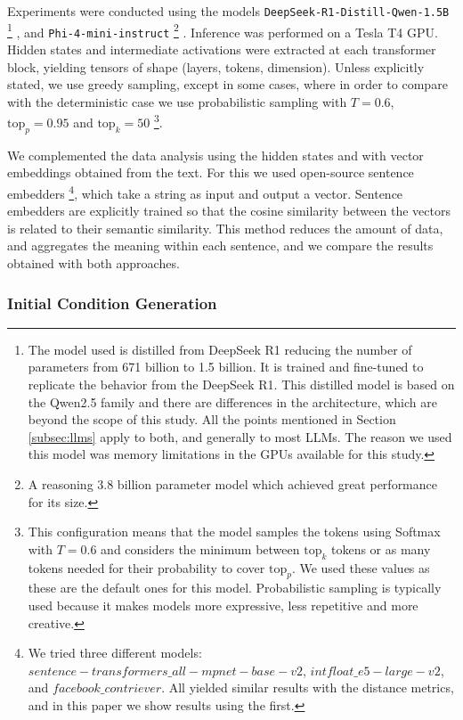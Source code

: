 \documentclass[a4paper,12pt]{article}
\begin{document}
    Experiments were conducted using the models \texttt{DeepSeek-R1-Distill-Qwen-1.5B} \footnote{The model used is distilled from DeepSeek R1 reducing the number of parameters from 671 billion to 1.5 billion. It is trained and fine-tuned to replicate the behavior from the DeepSeek R1. This distilled model is based on the Qwen2.5 family and there are differences in the architecture, which are beyond the scope of this study. All the points mentioned in Section \ref{subsec:llms} apply to both, and generally to most LLMs. The reason we used this model was memory limitations in the GPUs available for this study.} \cite{deepseek2025r1distillqwen1.5b}, and \texttt{Phi-4-mini-instruct} \footnote{A reasoning 3.8 billion parameter model which achieved great performance for its size.} \cite{microsoft2025phi4minitechnicalreportcompact, microsoft/Phi-4-mini-instruct}. 
    Inference was performed on a Tesla T4 GPU. Hidden states and intermediate activations were extracted at each transformer block, yielding tensors of shape (layers, tokens, dimension). 
    Unless explicitly stated, we use greedy sampling, except in some cases, where in order to compare with the deterministic case we use probabilistic sampling with $T=0.6$, $\text{top}_p = 0.95$ and $\text{top}_k = 50$ \footnote{This configuration means that the model samples the tokens using Softmax with $T=0.6$ and considers the minimum between $\text{top}_k$ tokens or as many tokens needed for their probability to cover $\text{top}_p$. We used these values as these are the default ones for this model. Probabilistic sampling is typically used because it makes models more expressive, less repetitive and more creative.}. 

    We complemented the data analysis using the hidden states and with vector embeddings obtained from the text. For this we used open-source sentence embedders \footnote{We tried three different models: $sentence-transformers\_all-mpnet-base-v2$, $intfloat\_e5-large-v2$, and  $facebook\_contriever$. All yielded similar results with the distance metrics, and in this paper we show results using the first.}, which take a string as input and output a vector. Sentence embedders are explicitly trained so that the cosine similarity between the vectors is related to their semantic similarity. This method reduces the amount of data, and aggregates the meaning within each sentence, and we compare the results obtained with both approaches. 

    \subsubsection{Initial Condition Generation}
    \label{subsec:init_cond_gen}
\end{document}
